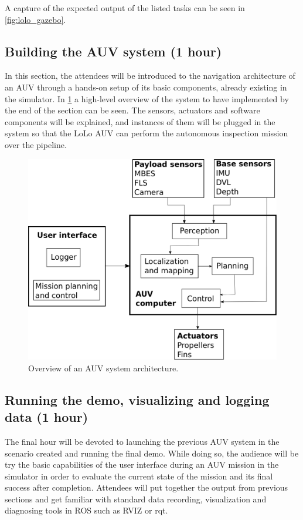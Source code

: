 \documentclass[
10pt, %
a4paper, %
oneside, %
headinclude,footinclude, %
BCOR5mm, %
]{scrartcl}
\begin{document}
A capture of the expected output of the listed tasks can be seen in \ref{fig:lolo_gazebo}.

\subsection{\textbf{Building the AUV system (1 hour)}}
In this section, the attendees will be introduced to the navigation architecture of an AUV through a hands-on setup of its basic components, already existing in the simulator.
In \ref{fig:auv_system} a high-level overview of the system to have implemented by the end of the section can be seen.
The sensors, actuators and software components will be explained, and instances of them will be plugged in the system so that the LoLo AUV can perform the autonomous inspection mission over the pipeline.

\begin{figure}[h]
    \centering
    \includegraphics[width=0.9\linewidth]{Figures/auv_system.png}
    \caption{Overview of an AUV system architecture.}
\label{fig:auv_system}
\end{figure}


\subsection{\textbf{Running the demo, visualizing and logging data (1 hour)}}
The final hour will be devoted to launching the previous AUV system in the scenario created and running the final demo.
While doing so, the audience will be try the basic capabilities of the user interface during an AUV mission in the simulator in order to evaluate the current state of the mission and its final success after completion.
Attendees will put together the output from previous sections and get familiar with standard data recording, visualization and diagnosing tools in ROS such as RVIZ or rqt.
\end{document}
